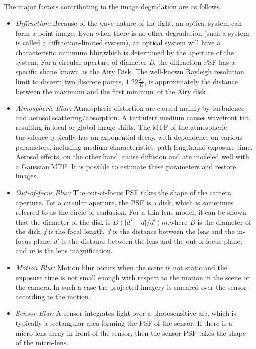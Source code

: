 \documentclass[a4paper]{book}
\begin{document}
	
	\paragraph*{}The major factors contributing to the image degradation are as follows.
	
	
	\begin{itemize}
		\item \textit{Diffraction:} Because of the wave nature of the light, an optical system can form a point image. Even when there is no other degradation (such a system is called a diffraction-limited system), an optical system will have a characteristic minimum blur,which is determined by the aperture of the system. For a circular aperture of diameter \textit{D}, the diffraction PSF has a specific shape known as the Airy Disk. The well-known Rayleigh resolution limit to discern two discrete points, $1.22\frac{\lambda f}{D} $, is approximately the distance between the maximum and the first minimum of the Airy disk.
		\item \textit{Atmospheric Blur:} Atmospheric distortion are caused mainly by turbulence and aerosol scattering/absorption. A turbulent medium causes wavefront tilt, resulting in local or global image shifts. The MTF of the atmospheric turbulence typically has an exponential decay, with dependence on various parameters, including medium characteristics, path length,and exposure time. Aerosol effects, on the other hand, cause diffusion and are modeled well with a Gaussian MTF. It is possible to estimate these parameters and restore images.
		\item \textit{Out-of-focus Blur:} The out-of-focus PSF takes the shape of the camera aperture. For a circular aperture, the PSF is a disk, which is sometimes referred to as the circle of confusion. For a thin-lens model, it can be shown that the diameter of the disk is $ D(|d' - d|/d')m $,where \textit{D} is the diameter of the disk, \textit{f} is the focal length, \textit{d} is the distance between the lens and the in-focus plane, $ d' $ is the distance between the lens and the out-of-focus plane, and \textit{m} is the lens magnification.
		\item \textit{Motion Blur:} Motion blur occurs when the scene is not static and the exposure time is not small enough with respect to the motion in the scene or the camera. In such a case the projected imagery is smeared over the sensor according to the motion.
		\item \textit{Sensor Blur:} A sensor integrates light over a photosensitive are, which is typically a rectangular area forming the PSF of the sensor. If there is a micro-lens array in front of the sensor, then the sensor PSF takes the shape of the micro-lens.

\end{itemize}
\end{document}
